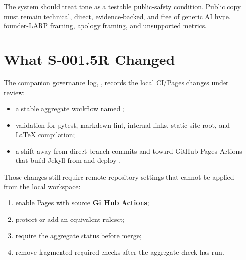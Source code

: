 \documentclass[a4paper,11pt,openany]{report}
\begin{document}
The system should treat tone as a testable public-safety condition. Public copy
must remain technical, direct, evidence-backed, and free of generic AI hype,
founder-LARP framing, apology framing, and unsupported metrics.


\chapter{What S-001.5R Changed}
\label{ch:changes}


The companion governance log, ,
records the local CI/Pages changes under review:

\begin{itemize}
  \item a stable aggregate workflow named ;
  \item validation for pytest, markdown lint, internal links, static site root,
    and LaTeX compilation;
  \item a shift away from direct  branch commits and toward
    GitHub Pages Actions that build Jekyll from  and deploy
    .
\end{itemize}

Those changes still require remote repository settings that cannot be applied
from the local workspace:

\begin{enumerate}
  \item enable Pages with source \textbf{GitHub Actions};
  \item protect  or add an equivalent ruleset;
  \item require the aggregate  status before merge;
  \item remove fragmented required checks after the aggregate check has run.
\end{enumerate}

\end{document}
